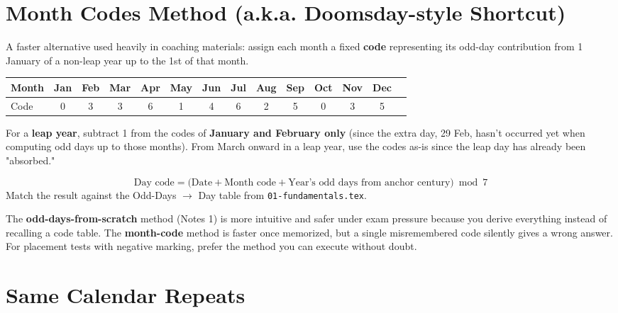 \documentclass[11pt]{article}
\begin{document}
\section{Month Codes Method (a.k.a. Doomsday-style Shortcut)}

A faster alternative used heavily in coaching materials: assign each month a fixed \textbf{code}
representing its odd-day contribution from 1 January of a non-leap year up to the 1st of that month.

\begin{formulabox}
\centering
\begin{tabular}{lccccccccccccc}
\toprule
Month & Jan & Feb & Mar & Apr & May & Jun & Jul & Aug & Sep & Oct & Nov & Dec \\
\midrule
Code & 0 & 3 & 3 & 6 & 1 & 4 & 6 & 2 & 5 & 0 & 3 & 5 \\
\bottomrule
\end{tabular}
\end{formulabox}

\begin{tipbox}
For a \textbf{leap year}, subtract 1 from the codes of \textbf{January and February only} (since the
extra day, 29 Feb, hasn't occurred yet when computing odd days up to those months). From March
onward in a leap year, use the codes as-is since the leap day has already been "absorbed."
\end{tipbox}

\begin{formulabox}
\[
\text{Day code} = \big(\text{Date} + \text{Month code} + \text{Year's odd days from anchor century}\big) \bmod 7
\]
Match the result against the Odd-Days $\to$ Day table from \texttt{01-fundamentals.tex}.
\end{formulabox}

\begin{warnbox}
The \textbf{odd-days-from-scratch} method (Notes 1) is more intuitive and safer under exam pressure
because you derive everything instead of recalling a code table. The \textbf{month-code} method is
faster once memorized, but a single misremembered code silently gives a wrong answer. For placement
tests with negative marking, prefer the method you can execute without doubt.
\end{warnbox}

\section{Same Calendar Repeats}
\end{document}

